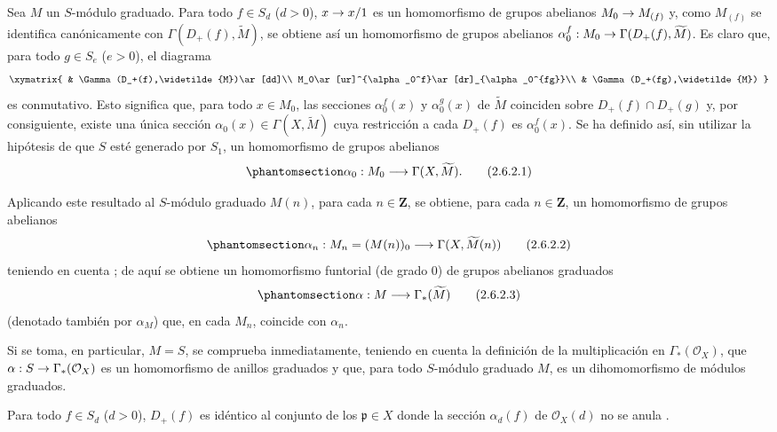 \documentclass[oneside,10pt]{amsart}
\makeatletter
\newcommand{\ega@arrow}[2]{\mathchoice{#1}{#2}{#2}{#2}}
\renewcommand{\to}{\ega@arrow{\longrightarrow}{\rightarrow}}
\newcommand{\oldpage}[2][]{\marginnote{\normalfont\footnotesize\textbf{#1}~|~#2}\ignorespaces}
\let\EGAOriginalLabel\label
\renewcommand{\label}[1]{\phantomsection\EGAOriginalLabel{#1}}
\makeatother
\begin{document}
\begin{env}[2.6.2]
\label{II.2.6.2-fr}
Sea $M$ un $S$-módulo graduado.
Para todo $f\in S_d$ ($d>0$), $x\to x/1$ es un homomorfismo de grupos abelianos $M_0\to M_{(f)}$ y, como $M_{(f)}$ se identifica canónicamente
\oldpage[II]{37}
con $\Gamma(D_+(f),\widetilde{M})$, se obtiene así un homomorfismo de grupos abelianos
$\alpha_0^f:M_0\to\Gamma(D_+(f),\widetilde{M})$.
Es claro que, para todo $g\in S_e$ ($e>0$), el diagrama
\[
  \xymatrix{
    & \Gamma(D_+(f),\widetilde{M})\ar[dd]\\
    M_0\ar[ur]^{\alpha_0^f}\ar[dr]_{\alpha_0^{fg}}\\
    & \Gamma(D_+(fg),\widetilde{M})
  }
\]
es conmutativo.
Esto significa que, para todo $x\in M_0$, las secciones $\alpha_0^f(x)$ y $\alpha_0^g(x)$ de $\widetilde{M}$ coinciden sobre $D_+(f)\cap D_+(g)$ y, por consiguiente, existe una única sección $\alpha_0(x)\in\Gamma(X,\widetilde{M})$ cuya restricción a cada $D_+(f)$ es $\alpha_0^f(x)$.
Se ha definido así, sin utilizar la hipótesis de que $S$ esté generado por $S_1$, un homomorfismo de grupos abelianos
\[
\label{II.2.6.2.1-fr}
  \alpha_0:M_0\longrightarrow\Gamma(X,\widetilde{M}).
\tag{2.6.2.1}
\]

Aplicando este resultado al $S$-módulo graduado $M(n)$, para cada $n\in\mathbf{Z}$, se obtiene, para cada $n\in\mathbf{Z}$, un homomorfismo de grupos abelianos
\[
\label{II.2.6.2.2-fr}
  \alpha_n:M_n=(M(n))_0\longrightarrow\Gamma(X,\widetilde{M}(n))
\tag{2.6.2.2}
\]
teniendo en cuenta ; de aquí se obtiene un homomorfismo funtorial (de grado $0$) de grupos abelianos graduados
\[
\label{II.2.6.2.3-fr}
  \alpha:M\longrightarrow\Gamma_*(\widetilde{M})
\tag{2.6.2.3}
\]
(denotado también por $\alpha_M$) que, en cada $M_n$, coincide con $\alpha_n$.

Si se toma, en particular, $M=S$, se comprueba inmediatamente, teniendo en cuenta la definición  de la multiplicación en $\Gamma_*(\mathcal{O}_X)$, que $\alpha:S\to\Gamma_*(\mathcal{O}_X)$ es un homomorfismo de anillos graduados y que, para todo $S$-módulo graduado $M$,  es un dihomomorfismo de módulos graduados.
\end{env}

\begin{proposition}[2.6.3]
\label{II.2.6.3-fr}
Para todo $f\in S_d$ ($d>0$), $D_+(f)$ es idéntico al conjunto de los $\mathfrak{p}\in X$ donde la sección $\alpha_d(f)$ de $\mathcal{O}_X(d)$ no se anula .
\end{proposition}
\end{document}
